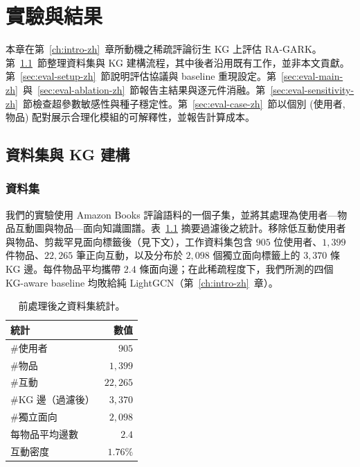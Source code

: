 \chapter{實驗與結果}
\label{ch:experiments-zh}
\label{ch:evaluation-zh}

\setlength{\tabcolsep}{8pt}

本章在第~\ref{ch:intro-zh}~章所動機之稀疏評論衍生 KG 上評估 RA-GARK。第~\ref{sec:eval-dataset-zh}~節整理資料集與 KG 建構流程，其中後者沿用既有工作，並非本文貢獻。第~\ref{sec:eval-setup-zh}~節說明評估協議與 baseline 重現設定。第~\ref{sec:eval-main-zh}~與~\ref{sec:eval-ablation-zh}~節報告主結果與逐元件消融。第~\ref{sec:eval-sensitivity-zh}~節檢查超參數敏感性與種子穩定性。第~\ref{sec:eval-case-zh}~節以個別 (使用者, 物品) 配對展示合理化模組的可解釋性，並報告計算成本。

\section{資料集與 KG 建構}
\label{sec:eval-dataset-zh}

\subsection{資料集}
\label{sec:eval-dataset-stats-zh}

我們的實驗使用 Amazon Books 評論語料的一個子集，並將其處理為使用者—物品互動圖與物品—面向知識圖譜。表~\ref{tab:dataset-stats-zh} 摘要過濾後之統計。移除低互動使用者與物品、剪裁罕見面向標籤後（見下文），工作資料集包含 $905$ 位使用者、$1{,}399$ 件物品、$22{,}265$ 筆正向互動，以及分布於 $2{,}098$ 個獨立面向標籤上的 $3{,}370$ 條 KG 邊。每件物品平均攜帶 $2.4$ 條面向邊；在此稀疏程度下，我們所測的四個 KG-aware baseline 均敗給純 LightGCN（第~\ref{ch:intro-zh}~章）。

\begin{table}[H]
\centering
\caption{前處理後之資料集統計。}
\label{tab:dataset-stats-zh}
\begin{tabular}{lr}
\toprule
統計 & 數值 \\
\midrule
\#使用者                           & $905$ \\
\#物品                             & $1{,}399$ \\
\#互動                             & $22{,}265$ \\
\#KG 邊（過濾後）                  & $3{,}370$ \\
\#獨立面向                         & $2{,}098$ \\
每物品平均邊數                     & $2.4$ \\
互動密度                           & $1.76\%$ \\
\bottomrule
\end{tabular}
\end{table}
\FloatBarrier


